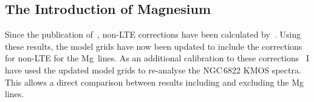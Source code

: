 \begin{table}
\begin{center}
\begin{tabular}{lc cccc c cccc}


  \hline
  \end{tabular}
  \end{center}
\end{table}

\subsection{The Introduction of Magnesium} %
\label{sub:with_mg}

Since the publication of~\citet[][where the results from this chapter are published]{2015ApJ...803...14P}, non-LTE corrections have been calculated by~\cite{2015ApJ...804..113B}.
Using these results, the model grids have now been updated to include the corrections for non-LTE for the Mg\,\1 lines.
As an additional calibration to these corrections~\citep[to the extensive testing in][]{2015ApJ...804..113B} I have used the updated model grids to re-analyse the NGC\,6822 KMOS spectra.
This allows a direct comparison between results including and excluding the Mg\,\1 lines.


